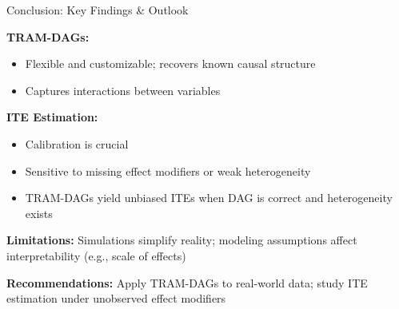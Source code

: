 \documentclass[onlytextwidth,english]{beamer}\usepackage[]{graphicx}\usepackage[]{xcolor}
\begin{document}
\begin{frame}{Conclusion: Key Findings \& Outlook}

\textbf{TRAM-DAGs:}
\begin{itemize}\setlength\itemsep{4pt}
  \item Flexible and customizable; recovers known causal structure
  \item Captures interactions between variables
\end{itemize}

\textbf{ITE Estimation:}
\begin{itemize}\setlength\itemsep{4pt}
  \item Calibration is crucial
  \item Sensitive to missing effect modifiers or weak heterogeneity
  \item TRAM-DAGs yield unbiased ITEs when DAG is correct and heterogeneity exists
\end{itemize}

\textbf{Limitations:}
Simulations simplify reality; modeling assumptions affect interpretability (e.g., scale of effects)

\textbf{Recommendations:}
Apply TRAM-DAGs to real-world data; study ITE estimation under unobserved effect modifiers

\end{frame}
\end{document}
